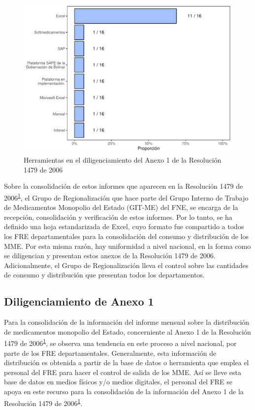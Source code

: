 \documentclass[
]{book}
\begin{document}
\begin{figure}

{\centering \includegraphics[width=0.85\linewidth]{InformeFinal_files/figure-latex/HerramientasDiligA1-1} 

}

\caption{Herramientas en el diligenciamiento del Anexo 1 de la Resolución 1479 de 2006}\label{fig:HerramientasDiligA1}
\end{figure}

Sobre la consolidación de estos informes que aparecen en la Resolución 1479 de 2006\textsuperscript{\protect\hyperlink{ref-MSPS1479-2006}{1}}, el Grupo de Regionalización que hace parte del Grupo Interno de Trabajo de Medicamentos Monopolio del Estado (GIT-ME) del FNE, se encarga de la recepción, consolidación y verificación de estos informes. Por lo tanto, se ha definido una hoja estandarizada de Excel, cuyo formato fue compartido a todos los FRE departamentales para la consolidación del consumo y distribución de los MME. Por esta misma razón, hay uniformidad a nivel nacional, en la forma como se diligencian y presentan estos anexos de la Resolución 1479 de 2006. Adicionalmente, el Grupo de Regionalización lleva el control sobre las cantidades de consumo y distribución que presentan todos los departamentos.

\hypertarget{diligenciamiento-de-anexo-1}{%
\subsection{Diligenciamiento de Anexo 1}\label{diligenciamiento-de-anexo-1}}

Para la consolidación de la información del informe mensual sobre la distribución de medicamentos monopolio del Estado, concerniente al Anexo 1 de la Resolución 1479 de 2006\textsuperscript{\protect\hyperlink{ref-MSPS1479-2006}{1}}, se observa una tendencia en este proceso a nivel nacional, por parte de los FRE departamentales. Generalmente, esta información de distribución es obtenida a partir de la base de datos o herramienta que emplea el personal del FRE para hacer el control de salida de los MME. Así se lleve esta base de datos en medios físicos y/o medios digitales, el personal del FRE se apoya en este recurso para la consolidación de la información del Anexo 1 de la Resolución 1479 de 2006\textsuperscript{\protect\hyperlink{ref-MSPS1479-2006}{1}}.
\end{document}

